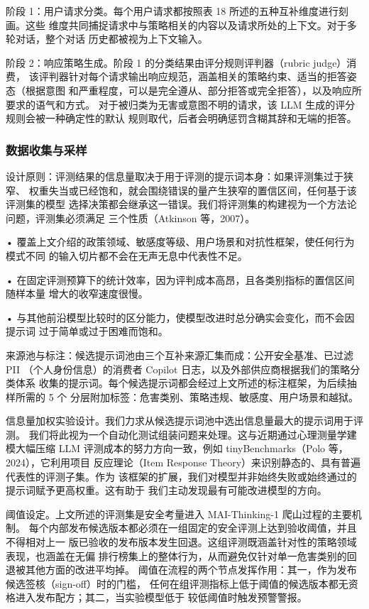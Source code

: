 \documentclass[
  10
]{article}
\begin{document}
阶段 1：用户请求分类。每个用户请求都按照表 18 所述的五种互补维度进行刻画。这些
维度共同捕捉请求中与策略相关的内容以及请求所处的上下文。对于多轮对话，整个对话
历史都被视为上下文输入。

阶段 2：响应策略生成。阶段 1 的分类结果由评分规则评判器（rubric judge）消费，
该评判器针对每个请求输出响应规范，涵盖相关的策略约束、适当的拒答姿态（根据意图
和严重程度，可以是完全遵从、部分拒答或完全拒答），以及响应所要求的语气和方式。
对于被归类为无害或意图不明的请求，该 LLM 生成的评分规则会被一种确定性的默认
规则取代，后者会明确惩罚含糊其辞和无端的拒答。

\subsubsection{数据收集与采样}\label{j.1.2-data-collection-sampling}

设计原则：评测结果的信息量取决于用于评测的提示词本身：如果评测集过于狭窄、
权重失当或已经饱和，就会围绕错误的量产生狭窄的置信区间，任何基于该评测集的模型
选择决策都会继承这一错误。我们将评测集的构建视为一个方法论问题，评测集必须满足
三个性质（Atkinson 等，2007）。

• 覆盖上文介绍的政策领域、敏感度等级、用户场景和对抗性框架，使任何行为模式不同
的输入切片都不会在无声无息中代表性不足。

• 在固定评测预算下的统计效率，因为评判成本高昂，且各类别指标的置信区间随样本量
增大的收窄速度很慢。

• 与其他前沿模型比较时的区分能力，使模型改进时总分确实会变化，而不会因提示词
过于简单或过于困难而饱和。

来源池与标注：候选提示词池由三个互补来源汇集而成：公开安全基准、已过滤 PII
（个人身份信息）的消费者 Copilot 日志，以及外部供应商根据我们的策略分类体系
收集的提示词。每个候选提示词都会经过上文所述的标注框架，为后续抽样所需的 5 个
分层附加标签：危害类别、策略违规、敏感度、用户场景和越狱。

信息量加权实验设计。我们力求从候选提示词池中选出信息量最大的提示词用于评测。
我们将此视为一个自动化测试组装问题来处理。这与近期通过心理测量学建模大幅压缩
LLM 评测成本的努力方向一致，例如 tinyBenchmarks（Polo 等，2024），它利用项目
反应理论（Item Response Theory）来识别静态的、具有普遍代表性的评测子集。作为
该框架的扩展，我们对模型并非始终失败或始终通过的提示词赋予更高权重。这有助于
我们主动发现最有可能改进模型的方向。

阈值设定。上文所述的评测集是安全考量进入 MAI-Thinking-1 爬山过程的主要机制。
每个内部发布候选版本都必须在一组固定的安全评测上达到验收阈值，并且不得相对上一
版已验收的发布版本发生回退。这组评测既涵盖针对性的策略领域表现，也涵盖在无偏
排行榜集上的整体行为，从而避免仅针对单一危害类别的回退被其他方面的改进平均掉。
阈值在流程的两个节点发挥作用：其一，作为发布候选签核（sign-off）时的门槛，
任何在组评测指标上低于阈值的候选版本都无资格进入发布配方；其二，当实验模型低于
较低阈值时触发预警警报。
\end{document}
